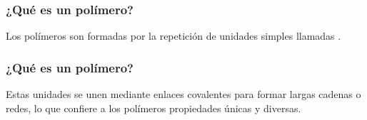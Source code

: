 \documentclass[14pt]{beamer}
\begin{document}
\begin{frame}
\frametitle{¿Qué es un polímero?}
Los polímeros son  formadas por la repetición de unidades simples llamadas .
\end{frame}
\begin{frame}
\frametitle{¿Qué es un polímero?}
Estas unidades se unen mediante enlaces covalentes para formar largas cadenas o redes, lo que confiere a los polímeros propiedades únicas y diversas.
\end{frame}
\end{document}
